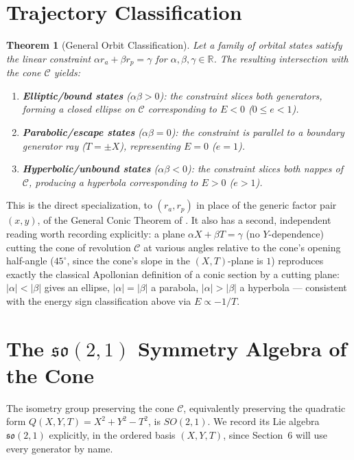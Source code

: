 \documentclass[11pt]{amsart}
\newtheorem{theorem}{Theorem}[section]
\begin{document}
\section{Trajectory Classification}

\begin{theorem}[General Orbit Classification]
Let a family of orbital states satisfy the linear constraint $\alpha r_a+\beta r_p=\gamma$ for $\alpha,\beta,\gamma\in\mathbb R$. The resulting intersection with the cone $\mathcal C$ yields:
\begin{enumerate}
\item[\textup{(1)}] \textbf{Elliptic/bound states} ($\alpha\beta>0$): the constraint slices both generators, forming a closed ellipse on $\mathcal C$ corresponding to $E<0$ ($0\le e<1$).
\item[\textup{(2)}] \textbf{Parabolic/escape states} ($\alpha\beta=0$): the constraint is parallel to a boundary generator ray ($T=\pm X$), representing $E=0$ ($e=1$).
\item[\textup{(3)}] \textbf{Hyperbolic/unbound states} ($\alpha\beta<0$): the constraint slices both nappes of $\mathcal C$, producing a hyperbola corresponding to $E>0$ ($e>1$).
\end{enumerate}
\end{theorem}

This is the direct specialization, to $(r_a,r_p)$ in place of the generic factor pair $(x,y)$, of the General Conic Theorem of \cite{Ebert2026Table}. It also has a second, independent reading worth recording explicitly: a plane $\alpha X+\beta T=\gamma$ (no $Y$-dependence) cutting the cone of revolution $\mathcal C$ at various angles relative to the cone's opening half-angle ($45^\circ$, since the cone's slope in the $(X,T)$-plane is $1$) reproduces exactly the classical Apollonian definition of a conic section by a cutting plane: $|\alpha|<|\beta|$ gives an ellipse, $|\alpha|=|\beta|$ a parabola, $|\alpha|>|\beta|$ a hyperbola --- consistent with the energy sign classification above via $E\propto -1/T$.

\section{The $\mathfrak{so}(2,1)$ Symmetry Algebra of the Cone}

The isometry group preserving the cone $\mathcal C$, equivalently preserving the quadratic form $Q(X,Y,T)=X^2+Y^2-T^2$, is $SO(2,1)$. We record its Lie algebra $\mathfrak{so}(2,1)$ explicitly, in the ordered basis $(X,Y,T)$, since Section~6 will use every generator by name.
\end{document}

